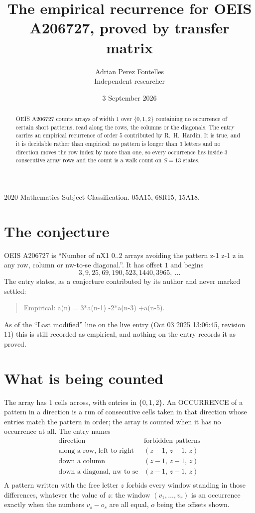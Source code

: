 \documentclass[11pt,a4paper]{article}
\title{The empirical recurrence for OEIS A206727, proved by transfer matrix}
\author{Adrian Perez Fontelles\\ \small Independent researcher}
\date{3 September 2026}
\theoremstyle{plain}
\theoremstyle{definition}
\begin{document}
\maketitle

\begin{abstract}
OEIS A206727 counts arrays of width $1$ over $\{0,1,2\}$ containing no occurrence of certain short
patterns, read along the rows, the columns or the diagonals. The entry carries an empirical
recurrence of order $5$ contributed by R.~H.~Hardin. It is true, and it is decidable
rather than empirical: no pattern is longer than $3$ letters and no direction moves the row
index by more than one, so every occurrence lies inside $3$ consecutive array rows and the
count is a walk count on $S=13$ states.
\end{abstract}

\noindent\small 2020 Mathematics Subject Classification. 05A15, 68R15, 15A18.\normalsize

\section{The conjecture}

OEIS A206727 is ``Number of nX1 0..2 arrays avoiding the pattern z-1 z-1 z in any row, column or nw-to-se diagonal.''. It has offset $1$ and begins
\[
3, 9, 25, 69, 190, 523, 1440, 3965,\ \dots
\]
The entry states, as a conjecture contributed by its author and never marked settled:
\begin{quote}
Empirical: a(n) = 3*a(n-1) -2*a(n-3) +a(n-5).
\end{quote}
As of the ``Last modified'' line on the live entry (Oct 03 2025 13:06:45, revision 11) this is still
recorded as empirical, and nothing on the entry records it as proved.

\section{What is being counted}

The array has $1$ cells across, with entries in $\{0,1,2\}$. An OCCURRENCE of a pattern in a
direction is a run of consecutive cells taken in that direction whose entries match the pattern
in order; the array is counted when it has no occurrence at all. The entry names
\[
\begin{array}{ll}
\text{direction} & \text{forbidden patterns} \\[2pt]
\text{along a row, left to right} & (z-1,\,z-1,\,z) \\
\text{down a column} & (z-1,\,z-1,\,z) \\
\text{down a diagonal, nw to se} & (z-1,\,z-1,\,z) \\
\end{array}
\]
 A pattern written with the free letter $z$ forbids every window standing in those differences, whatever the value of $z$: the window $(v_1,\dots,v_r)$ is an occurrence exactly when the numbers $v_s-o_s$ are all equal, $o$ being the offsets shown.
\end{document}
